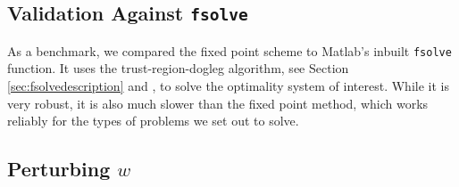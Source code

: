 \documentclass[11pt, a4paper]{article}
\theoremstyle{definition}
\begin{document}
	
	\subsection{Validation Against \texttt{fsolve}}
	As a benchmark, we compared the fixed point scheme to Matlab's inbuilt \texttt{fsolve} function. It uses the trust-region-dogleg algorithm, see Section \ref{sec:fsolvedescription} and \cite{Powell1}, to solve the optimality system of interest. While it is very robust, it is also much slower than the fixed point method, which works reliably for the types of problems we set out to solve. 
	
	
	
	\subsection{Perturbing $w$}
	
	
\end{document}
